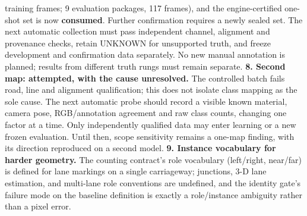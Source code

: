 \documentclass[journal]{IEEEtran}
\begin{document}
training frames; 9 evaluation packages, 117 frames), and the engine-certified one-shot set is
now \textbf{consumed}. Further confirmation requires a newly sealed set. The next automatic collection
must pass independent channel, alignment and provenance checks, retain UNKNOWN for unsupported
truth, and freeze development and confirmation data separately. No new manual annotation is
planned; results from different truth rungs must remain separate.
\textbf{8. Second map: attempted, with the cause unresolved.} The controlled batch fails road, line
and alignment qualification; this does not isolate class mapping as the sole cause. The next
automatic probe should record a visible known material, camera pose, RGB/annotation agreement
and raw class counts, changing one factor at a time. Only independently qualified data may enter
learning or a new frozen evaluation. Until then, scope sensitivity remains a one-map finding,
with its direction reproduced on a second model.
\textbf{9. Instance vocabulary for harder geometry.} The counting contract's role vocabulary
(left/right, near/far) is defined for lane markings on a single carriageway; junctions, 3-D lane
estimation, and multi-lane role conventions are undefined, and the identity gate's failure mode
on the baseline definition is exactly a role/instance ambiguity rather than a pixel error.
\end{document}
